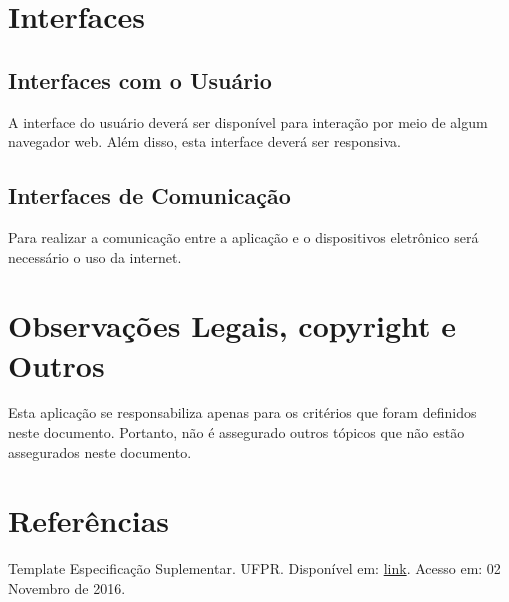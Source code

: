 \begin{apendicesenv}
{\large {\section { Interfaces \\ } } }

{\subsection {Interfaces com o Usuário\\ }}

A interface do usuário deverá ser disponível para interação por meio de algum navegador web. Além disso, esta interface deverá ser responsiva.\\

{\subsection {Interfaces de Comunicação\\ }}

Para realizar a comunicação entre a aplicação e o dispositivos eletrônico será necessário o uso da internet.\\

{\large {\section { Observações Legais, copyright e Outros  \\ } } }

Esta aplicação se responsabiliza apenas para os critérios que foram definidos neste documento. Portanto, não é assegurado outros tópicos que não estão assegurados neste documento. \\

{\large {\section { Referências \\ } } }

Template Especificação Suplementar. UFPR. Disponível em: \href{http://www.funpar.ufpr.br:8080/rup/webtmpl/templates/req/rup_sspec.htm}{link}. Acesso em: 02 Novembro de 2016.\\

\end{apendicesenv}
